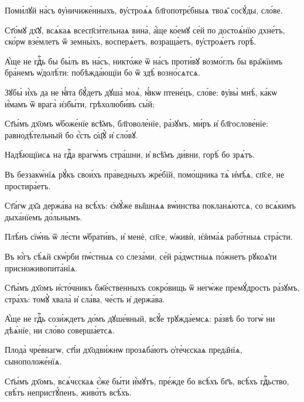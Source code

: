 \hKv Поми́лꙋй на́съ ᲂу҆ничиже́нныхъ, ᲂу҆строѧ́ѧ  бл҃гопотрє́бныѧ твоѧ̑ сосꙋ́ды, сло́ве. 
%

\hKv Ст҃о́мꙋ дх҃ꙋ, всѧ́каѧ всесп҃си́тельнаѧ вина̀, а҆́ще  ко́емꙋ се́й по достоѧ́нїю дхне́тъ,   ско́рѡ взе́млетъ ѿ земны́хъ, восперѧ́етъ, возраща́етъ,  ᲂу҆строѧ́етъ горѣ̀. 
%

\hKv А҆́ще не гдⷭ҇ь бы бы́лъ въ на́съ, никто́же ѿ на́съ  проти́вꙋ возмо́глъ бы вра̑жїимъ бра́немъ ѡ҆долѣ́ти:  побѣжда́ющїи бо ѿ здѣ̀ возно́сѧтсѧ. 

\hKv Зꙋбы̀ и҆́хъ да не ꙗ҆́та бꙋ́детъ дꙋша̀ моѧ̀, ꙗ҆́кѡ  птене́цъ, сло́ве: ᲂу҆вы̀ мнѣ̀, ка́кѡ и҆́мамъ ѿ врага̀  и҆збы́ти, грѣхолюби́въ сы́й; 
%

\hKv Ст҃ы́мъ дх҃омъ ѡ҆боже́нїе всѣ̑мъ, бл҃говоле́нїе,  ра́зꙋмъ, ми́ръ и҆ бл҃гослове́нїе: равнодѣ́тельный бо  є҆́сть ѻ҆ц҃ꙋ̀ и҆ сло́вꙋ. 
%

\hKv Надѣ́ющїисѧ на гдⷭ҇а врагѡ́мъ стра́шни, и҆ всѣ̑мъ ди́вни,  горѣ́ бо зрѧ́тъ. 

\hKv Въ беззакѡ́нїѧ рꙋ́къ свои́хъ пра́ведныхъ жре́бїй, помо́щника  тѧ̀ и҆мѣ́ѧ, сп҃се, не простира́етъ.  
%

\hKv Ст҃а́гѡ дх҃а держа́ва на всѣ́хъ: є҆мꙋ́же вы̑шнѧѧ  вѡ́инства покланѧ́ютсѧ, со всѧ́кимъ дыха́нїемъ до́льнымъ. 
%

\hKv Плѣ́нъ сїѡ́нь ѿ ле́сти ѡ҆брати́въ, и҆ менѐ, сп҃се,  ѡ҆живѝ, и҆з̾има́ѧ рабо́тныѧ стра́сти. 

\hKv Въ ю҆́гъ сѣ́ѧй скѡ́рби пѡ́стныѧ со слеза́ми, се́й  ра́дѡстныѧ по́жнетъ рꙋкоѧ̑ти присноживопита́нїѧ. 
%

\hKv Ст҃ы́мъ дх҃омъ и҆сто́чникъ бж҃е́ственныхъ сокро́вищь  ѿ негѡ́же премꙋ́дрость ра́зꙋмъ, стра́хъ: томꙋ̀ хвала̀ и҆  сла́ва, че́сть и҆ держа́ва.  
%

\hKv А҆́ще не гдⷭ҇ь сози́ждетъ до́мъ дꙋше́вный, всꙋ́е  трꙋжда́емсѧ: ра́звѣ бо тогѡ̀ ни дѣѧ́нїе, ни сло́во  соверша́етсѧ.  

\hKv Плода̀ чре́внагѡ, ст҃і́и дх҃одви́жнѡ прозѧба́ютъ  ѻ҆те́чєскаѧ преда̑нїѧ, сыноположе́нїѧ. 
%

\hKv Ст҃ы́мъ дх҃омъ, всѧ́чєскаѧ є҆́же бы́ти и҆́мꙋтъ,  пре́жде бо всѣ́хъ бг҃ъ, всѣ́хъ гдⷭ҇ьство, свѣ́тъ  непристꙋ́пенъ, живо́тъ всѣ́хъ. 
%

